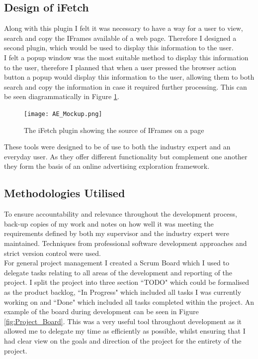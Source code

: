 \documentclass[12pt]{article}
\begin{document}
\subsection{Design of iFetch}
Along with this plugin I felt it was necessary to have a way for a user to view, search and copy the IFrames available of a web page. Therefore I designed a second plugin, which would be used to display this information to the user. \\

I felt a popup window was the most suitable method to display this information to the user, therefore I planned that when a user pressed the browser action button a popup would display this information to the user, allowing them to both search and copy the information in case it required further processing. This can be seen diagrammatically in Figure \ref{fig:AE_Mockup}.

\begin{figure}[H]
    \centering
    \texttt{[image: AE\_Mockup.png]}
    \caption{The iFetch plugin showing the source of IFrames on a page}
    \label{fig:AE_Mockup}
\end{figure}

These tools were designed to be of use to both the industry expert and an everyday user. As they offer different functionality but complement one another they form the basis of an online advertising exploration framework. 

\subsection{Methodologies Utilised}
To ensure accountability and relevance throughout the development process, back-up copies of my work and notes on how well it was meeting the requirements defined by both my supervisor and the industry expert were maintained. Techniques from professional software development approaches and strict version control were used. \\

For general project management I created a Scrum Board which I used to delegate tasks relating to all areas of the development and reporting of the project. I split the project into three section ``TODO" which could be formalised as the product backlog, ``In Progress" which included all tasks I was currently working on and ``Done" which included all tasks completed within the project. An example of the board during development can be seen in Figure \ref{fig:Project_Board}. This was a very useful tool throughout development as it allowed me to delegate my time as efficiently as possible, whilst ensuring that I had clear view on the goals and direction of the project for the entirety of the project.
\end{document}
